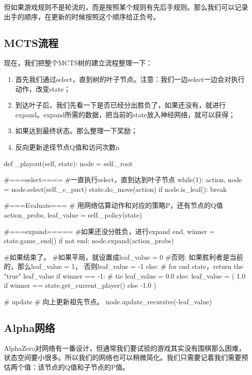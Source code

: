 \documentclass[12pt]{article}
\begin{document}
但如果游戏规则不是轮流的，而是按照某个规则有先后手规则。那么我们可以记录出手的顺序，在更新的时候按照这个顺序给正负号。

\subsection{MCTS流程}
现在，我们把整个MCTS树的建立流程整理一下：
\begin{enumerate}
\setlength{\itemsep}{0pt}
\setlength{\parsep}{0pt}
\setlength{\parskip}{0pt}
    \item 首先我们通过select，直到树的叶子节点。注意：我们一边select一边会对执行动作，改变state；
    \item 到达叶子后，我们先看一下是否已经分出胜负了，如果还没有，就进行expand。expand所需的数据，把当前的state放入神经网络，就可以获得；
    \item 如果达到最终状态。那么整理一下奖励；
    \item 反向更新途径节点Q值和访问次数n
\end{enumerate}

\begin{python}
def _playout(self, state):
    node = self._root

    #===select====
    #一直执行select，直到达到叶子节点
    while(1):
        action, node = node.select(self._c_puct)
        state.do_move(action)   
        if node.is_leaf():
            break

    #===Evaluate===
    # 用网络估算动作和对应的策略P，还有节点的Q值
    action_probs, leaf_value = self._policy(state)

    #===expand=====
    #如果还没分胜负，进行expand
    end, winner = state.game_end()
    if not end:
        node.expand(action_probs)

    #如果结束了。
    #如果平局，就设置成leaf_value = 0
    #否则: 如果胜利者是当前的，那么leaf_value = 1， 否则leaf_value = -1
    else:
        # for end state，return the "true" leaf_value
        if winner == -1:  # tie
            leaf_value = 0.0
        else:
            leaf_value = (
                1.0 if winner == state.get_current_player() else -1.0
            )
            
    # update 
    # 向上更新祖先节点。
    node.update_recursive(-leaf_value)
\end{python}

\subsection{Alpha网络}
AlphaZero对网络有一番设计，但通常我们要试验的游戏其实没有围棋那么困难，状态空间要小很多。所以我们的网络也可以稍微简化。我们只需要记着我们需要预估两个值：该节点的Q值和子节点的P值。
\end{document}

